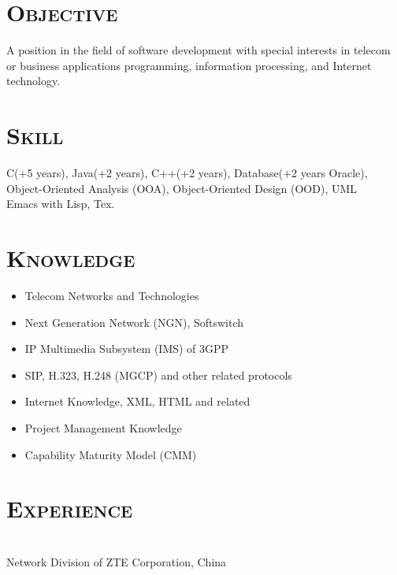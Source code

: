 \documentclass[margin,12pt]{res}
\begin{document}
\begin{resume}
 
\section{\textsc{Objective}}  A position in the field of software development with special 
                interests in telecom or business applications programming, 
                information processing, and Internet technology. 

\section{\textsc{Skill}} 
                C(+5 years), Java(+2 years), C++(+2 years), Database(+2 years Oracle),\\
                Object-Oriented Analysis (OOA),  Object-Oriented Design (OOD), UML\\
                Emacs with Lisp, Tex.

\section{\textsc{Knowledge}} 
\begin{itemize}
    \item Telecom Networks and Technologies
    \item Next Generation Network (NGN), Softswitch
    \item IP Multimedia Subsystem (IMS) of 3GPP
    \item SIP, H.323, H.248 (MGCP) and other related protocols
    \item Internet Knowledge, XML, HTML and related
    \item Project Management Knowledge
    \item Capability Maturity Model (CMM)
\end{itemize}
 
\section{\textsc{Experience}} 
 \\
Network Division of ZTE Corporation, China


\end{resume}
\end{document}
